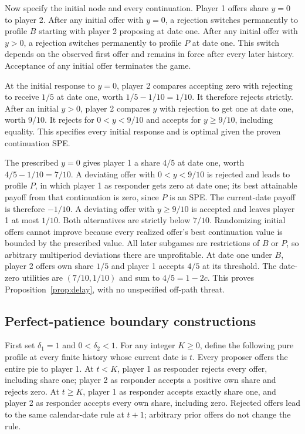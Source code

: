 \documentclass[11pt]{article}
\begin{document}
Now specify the initial node and every continuation. Player 1 offers share $y=0$ to player 2. After any initial offer with $y=0$, a rejection switches permanently to profile $B$ starting with player 2 proposing at date one. After any initial offer with $y>0$, a rejection switches permanently to profile $P$ at date one. This switch depends on the observed first offer and remains in force after every later history. Acceptance of any initial offer terminates the game.

At the initial response to $y=0$, player 2 compares accepting zero with rejecting to receive $1/5$ at date one, worth $1/5-1/10=1/10$. It therefore rejects strictly. After an initial $y>0$, player 2 compares $y$ with rejection to get one at date one, worth $9/10$. It rejects for $0<y<9/10$ and accepts for $y\ge9/10$, including equality. This specifies every initial response and is optimal given the proven continuation SPE.

The prescribed $y=0$ gives player 1 a share $4/5$ at date one, worth $4/5-1/10=7/10$. A deviating offer with $0<y<9/10$ is rejected and leads to profile $P$, in which player 1 as responder gets zero at date one; its best attainable payoff from that continuation is zero, since $P$ is an SPE. The current-date payoff is therefore $-1/10$. A deviating offer with $y\ge9/10$ is accepted and leaves player 1 at most $1/10$. Both alternatives are strictly below $7/10$. Randomizing initial offers cannot improve because every realized offer's best continuation value is bounded by the prescribed value. All later subgames are restrictions of $B$ or $P$, so arbitrary multiperiod deviations there are unprofitable. At date one under $B$, player 2 offers own share $1/5$ and player 1 accepts $4/5$ at its threshold. The date-zero utilities are $(7/10,1/10)$ and sum to $4/5=1-2c$. This proves Proposition~\ref{prop:delay}, with no unspecified off-path threat.

\subsection{Perfect-patience boundary constructions}\label{app:boundaries}
First set $\delta_1=1$ and $0<\delta_2<1$. For any integer $K\ge0$, define the following pure profile at every finite history whose current date is $t$. Every proposer offers the entire pie to player 1. At $t<K$, player 1 as responder rejects every offer, including share one; player 2 as responder accepts a positive own share and rejects zero. At $t\ge K$, player 1 as responder accepts exactly share one, and player 2 as responder accepts every own share, including zero. Rejected offers lead to the same calendar-date rule at $t+1$; arbitrary prior offers do not change the rule.
\end{document}
